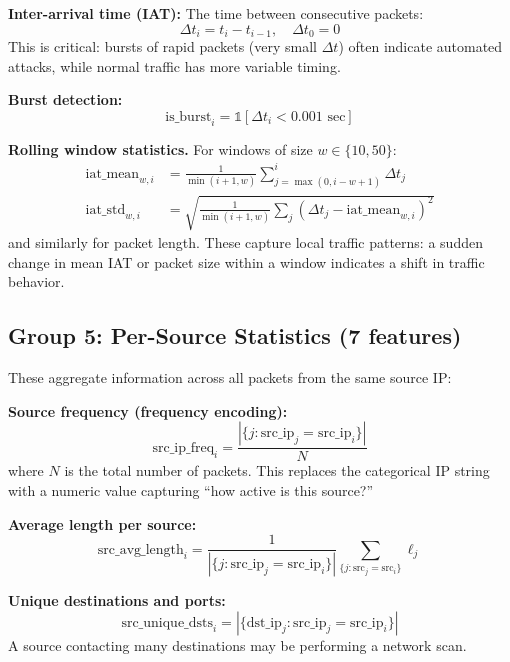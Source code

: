 \documentclass[conference]{IEEEtran}
\begin{document}
\textbf{Inter-arrival time (IAT):} The time between consecutive packets:
\begin{equation}
    \Delta t_i = t_i - t_{i-1}, \quad \Delta t_0 = 0
\end{equation}
This is critical: bursts of rapid packets (very small $\Delta t$) often indicate automated attacks, while normal traffic has more variable timing.

\textbf{Burst detection:}
\begin{equation}
    \text{is\_burst}_i = \mathbb{1}[\Delta t_i < 0.001 \text{ sec}]
\end{equation}

\textbf{Rolling window statistics.} For windows of size $w \in \{10, 50\}$:
\begin{align}
    \text{iat\_mean}_{w,i} &= \frac{1}{\min(i+1, w)} \sum_{j=\max(0, i-w+1)}^{i} \Delta t_j \\
    \text{iat\_std}_{w,i} &= \sqrt{\frac{1}{\min(i+1,w)} \sum_{j} (\Delta t_j - \text{iat\_mean}_{w,i})^2}
\end{align}
and similarly for packet length. These capture local traffic patterns: a sudden change in mean IAT or packet size within a window indicates a shift in traffic behavior.

\subsection{Group 5: Per-Source Statistics (7 features)}

These aggregate information across all packets from the same source IP:

\textbf{Source frequency (frequency encoding):}
\begin{equation}
    \text{src\_ip\_freq}_i = \frac{|\{j : \text{src\_ip}_j = \text{src\_ip}_i\}|}{N}
\end{equation}
where $N$ is the total number of packets. This replaces the categorical IP string with a numeric value capturing ``how active is this source?''

\textbf{Average length per source:}
\begin{equation}
    \text{src\_avg\_length}_i = \frac{1}{|\{j : \text{src\_ip}_j = \text{src\_ip}_i\}|} \sum_{\{j : \text{src}_j = \text{src}_i\}} \ell_j
\end{equation}

\textbf{Unique destinations and ports:}
\begin{equation}
    \text{src\_unique\_dsts}_i = |\{\text{dst\_ip}_j : \text{src\_ip}_j = \text{src\_ip}_i\}|
\end{equation}
A source contacting many destinations may be performing a network scan.
\end{document}
